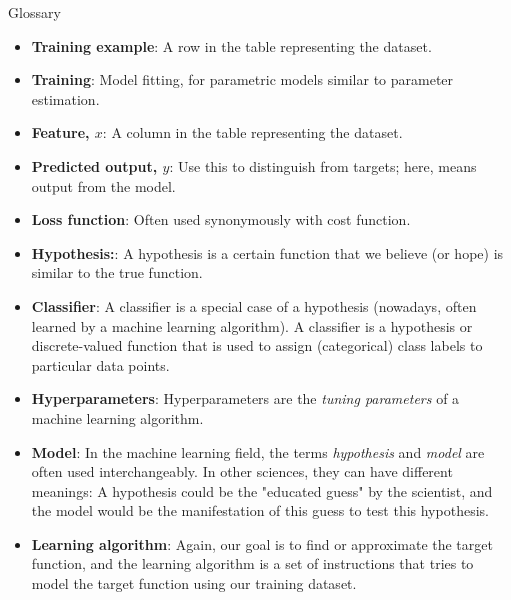 \documentclass[compress,oilve]{beamer}
\begin{document}
\begin{frame}{Glossary}
\begin{itemize}
\item \textbf{Training example}: A row in the table representing the dataset.
\item \textbf{Training}: Model fitting, for parametric models similar to parameter estimation.
\item \textbf{Feature, $x$}: A column in the table representing the dataset.
\item \textbf{Predicted output, $\hat{y}$}: Use this to distinguish from targets; here, means output from the model.
\item \textbf{Loss function}: Often used synonymously with cost function.
\item \textbf{Hypothesis:}: A hypothesis is a certain function that we believe (or hope) is similar to the true function.
\item \textbf{Classifier}: A classifier is a special case of a hypothesis (nowadays, often learned by a machine learning algorithm). A classifier is a hypothesis or discrete-valued function that is used to assign (categorical) class labels to particular data points. 
\item \textbf{Hyperparameters}: Hyperparameters are the \textit{tuning parameters} of a machine learning algorithm.
\item \textbf{Model}: In the machine learning field, the terms \textit{hypothesis} and \textit{model} are often used interchangeably. In other sciences, they can have different meanings: A hypothesis could be the "educated guess" by the scientist, and the model would be the manifestation of this guess to test this hypothesis.
\item \textbf{Learning algorithm}: Again, our goal is to find or approximate the target function, and the learning algorithm is a set of instructions that tries to model the target function using our training dataset.
\end{itemize}
\end{frame}
\end{document}
